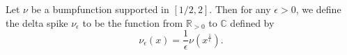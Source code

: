 \begin{definition}[DeltaSpike]
\label{DeltaSpike}
\leanok
Let $\nu$ be a bumpfunction supported in $[1/2,2]$. Then for any $\epsilon>0$, we define the
  delta spike $\nu_\epsilon$ to be the function from $\mathbb{R}_{>0}$ to $\mathbb{C}$ defined by
  $$\nu_\epsilon(x) = \frac{1}{\epsilon}\nu\left(x^{\frac{1}{\epsilon}}\right).$$
\end{definition}
